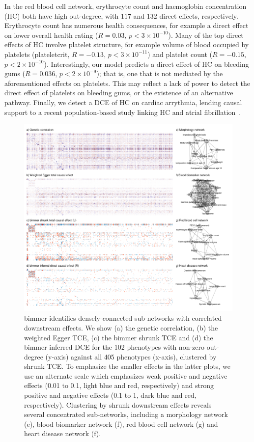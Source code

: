 \documentclass{article}
\begin{document}
In the red blood cell network, erythrocyte count and haemoglobin concentration (HC)
both have high out-degree, with $117$ and $132$ direct effects, respectively.
Erythrocyte count has numerous health consequences,
for example a direct effect on lower overall health rating ($R = 0.03$, $p < 3 \times 10^{-10}$).
Many of the top direct effects of HC involve platelet structure,
for example volume of blood occupied by platelets (plateletcrit, $R = -0.13$, $p < 3 \times 10^{-11}$)
and platelet count
($R = -0.15$, $p < 2 \times 10^{-10}$). Interestingly, our model predicts a direct effect of
HC on bleeding gums ($R = 0.036$, $p < 2 \times 10^{-9}$); that is, one
that is not mediated by the aforementioned effects on platelets. This may reflect a lack of power to detect
the direct effect of platelets on bleeding gums, or the existence of an alternative pathway.
Finally, we detect a DCE of HC on cardiac arrythmia, lending causal
support to a recent population-based study linking HC and atrial fibrillation~\cite{Lim2020}.


\begin{figure}\label{figure5}
\includegraphics[width=\textwidth]{figures/figure5.png}
\caption{bimmer identifies densely-connected sub-networks with correlated downstream effects.
We show (a) the genetic correlation, (b) the weighted Egger TCE, (c) the bimmer shrunk
TCE and (d) the bimmer inferred DCE for the 102 phenotypes with non-zero out-degree (y-axis)
against all 405 phenotypes (x-axis), clustered by shrunk TCE. To emphasize the smaller effects
in the latter plots, we use an alternate scale which emphasizes weak positive and negative effects
(0.01 to 0.1, light blue and red, respectively) and strong positive and negative effects
(0.1 to 1, dark blue and red, respectively). Clustering by shrunk downstream effects reveals
several concentrated sub-networks, including a morphology network (e), blood biomarker
network (f), red blood cell network (g) and heart disease network (f).}
\end{figure}
\end{document}
